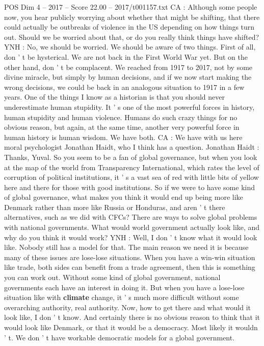\begin{textsample}{POS Dim 4 – 2017 – Score 22.00 – 2017/t001157.txt}
CA : Although some people now, you hear publicly worrying about whether that might be shifting, that there could actually be outbreaks of violence in the US depending on how things turn out.
Should we be worried about that, or do you really think things have shifted?
YNH : No, we should be worried.
We should be aware of two things.
First of all, don ' t be hysterical.
We are not back in the First World War yet.
But on the other hand, don ' t be complacent.
We reached from 1917 to 2017, not by some divine miracle, but simply by human decisions, and if we now start making the wrong decisions, we could be back in an analogous situation to 1917 in a few years.
One of the things I know as a historian is that you should never underestimate human stupidity.
It ' s one of the most powerful forces in history, human stupidity and human violence.
Humans do such crazy things for no obvious reason, but again, at the same time, another very powerful force in human history is human wisdom.
We have both.
CA : We have with us here moral psychologist Jonathan Haidt, who I think has a question.
Jonathan Haidt : Thanks, Yuval.
So you seem to be a fan of global governance, but when you look at the map of the world from Transparency International, which rates the level of corruption of political institutions, it ' s a vast sea of red with little bits of yellow here and there for those with good institutions.
So if we were to have some kind of global governance, what makes you think it would end up being more like Denmark rather than more like Russia or Honduras, and aren ' t there alternatives, such as we did with CFCs?
There are ways to solve global problems with national governments.
What would world government actually look like, and why do you think it would work?
YNH : Well, I don ' t know what it would look like.
Nobody still has a model for that.
The main reason we need it is because many of these issues are lose-lose situations.
When you have a win-win situation like trade, both sides can benefit from a trade agreement, then this is something you can work out.
Without some kind of global government, national governments each have an interest in doing it.
But when you have a lose-lose situation like with \textbf{climate} change, it ' s much more difficult without some overarching authority, real authority.
Now, how to get there and what would it look like, I don ' t know.
And certainly there is no obvious reason to think that it would look like Denmark, or that it would be a democracy.
Most likely it wouldn ' t.
We don ' t have workable democratic models for a global government.

\end{textsample}

